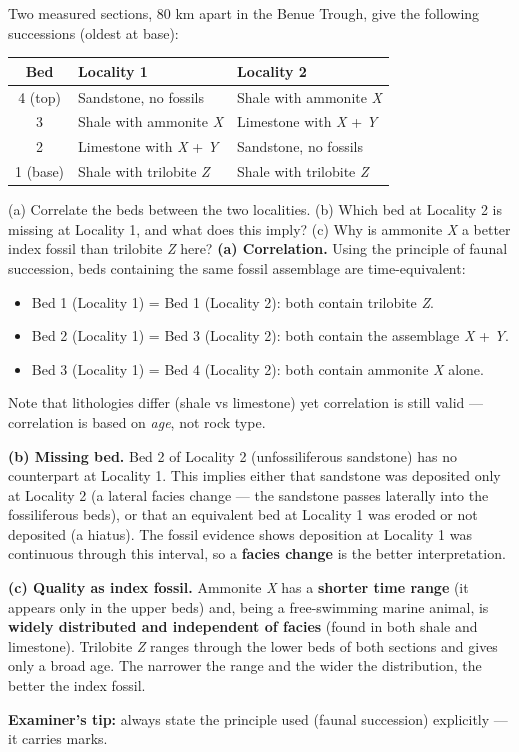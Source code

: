 \documentclass[11pt]{article}
\begin{document}
\begin{exoresolu}
Two measured sections, 80 km apart in the Benue Trough, give the following successions (oldest at base):

\begin{center}
\begin{tabular}{|c|l|l|}
\hline
\rowcolor{popblueL} Bed & Locality 1 & Locality 2 \\
\hline
4 (top) & Sandstone, no fossils & Shale with ammonite \emph{X} \\
3 & Shale with ammonite \emph{X} & Limestone with \emph{X} + \emph{Y} \\
2 & Limestone with \emph{X} + \emph{Y} & Sandstone, no fossils \\
1 (base) & Shale with trilobite \emph{Z} & Shale with trilobite \emph{Z} \\
\hline
\end{tabular}
\end{center}

(a) Correlate the beds between the two localities. (b) Which bed at Locality 2 is missing at Locality 1, and what does this imply? (c) Why is ammonite \emph{X} a better index fossil than trilobite \emph{Z} here?
\tcblower
\textbf{(a) Correlation.} Using the principle of faunal succession, beds containing the same fossil assemblage are time-equivalent:
\begin{itemize}
\item Bed 1 (Locality 1) = Bed 1 (Locality 2): both contain trilobite \emph{Z}.
\item Bed 2 (Locality 1) = Bed 3 (Locality 2): both contain the assemblage \emph{X} + \emph{Y}.
\item Bed 3 (Locality 1) = Bed 4 (Locality 2): both contain ammonite \emph{X} alone.
\end{itemize}
Note that lithologies differ (shale vs limestone) yet correlation is still valid — correlation is based on \emph{age}, not rock type.

\textbf{(b) Missing bed.} Bed 2 of Locality 2 (unfossiliferous sandstone) has no counterpart at Locality 1. This implies either that sandstone was deposited only at Locality 2 (a lateral facies change — the sandstone passes laterally into the fossiliferous beds), or that an equivalent bed at Locality 1 was eroded or not deposited (a hiatus). The fossil evidence shows deposition at Locality 1 was continuous through this interval, so a \textbf{facies change} is the better interpretation.

\textbf{(c) Quality as index fossil.} Ammonite \emph{X} has a \textbf{shorter time range} (it appears only in the upper beds) and, being a free-swimming marine animal, is \textbf{widely distributed and independent of facies} (found in both shale and limestone). Trilobite \emph{Z} ranges through the lower beds of both sections and gives only a broad age. The narrower the range and the wider the distribution, the better the index fossil.

\textbf{Examiner's tip:} always state the principle used (faunal succession) explicitly — it carries marks.
\end{exoresolu}
\end{document}
